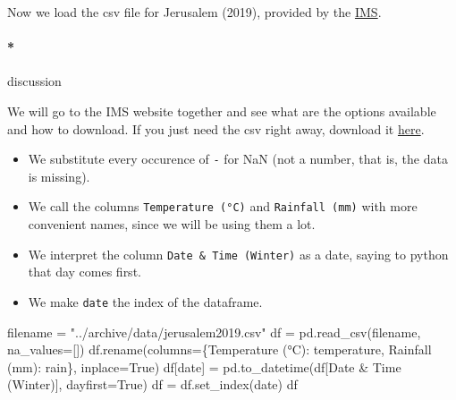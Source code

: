 \documentclass[
  letterpaper,
  DIV=11,
  numbers=noendperiod,
  oneside]{scrreprt}
\let\oldparagraph\paragraph
\renewcommand{\paragraph}[1]{\oldparagraph{#1}\mbox{}}
\newenvironment{Shaded}{\begin{snugshade}}{\end{snugshade}}
\newcommand{\NormalTok}[1]{\textcolor[rgb]{0.00,0.23,0.31}{#1}}
\newcommand{\OperatorTok}[1]{\textcolor[rgb]{0.37,0.37,0.37}{#1}}
\newcommand{\StringTok}[1]{\textcolor[rgb]{0.13,0.47,0.30}{#1}}
\newcommand{\VariableTok}[1]{\textcolor[rgb]{0.07,0.07,0.07}{#1}}
\providecommand{\tightlist}{%
  \setlength{\itemsep}{0pt}\setlength{\parskip}{0pt}}\usepackage{longtable,booktabs,array}
\begin{document}
Now we load the csv file for Jerusalem (2019), provided by the
\href{https://ims.gov.il/en/data_gov}{IMS}.

\hypertarget{discussion-2}{%
\paragraph*{discussion}\label{discussion-2}}

We will go to the IMS website together and see what are the options
available and how to download. If you just need the csv right away,
download it
\href{https://raw.githubusercontent.com/yairmau/time-series/main/archive/data/jerusalem2019.csv}{here}.

\begin{itemize}
\tightlist
\item
  We substitute every occurence of \texttt{-} for NaN (not a number,
  that is, the data is missing).
\item
  We call the columns \texttt{Temperature\ (°C)} and
  \texttt{Rainfall\ (mm)} with more convenient names, since we will be
  using them a lot.
\item
  We interpret the column \texttt{Date\ \&\ Time\ (Winter)} as a date,
  saying to python that day comes first.
\item
  We make \texttt{date} the index of the dataframe.
\end{itemize}

\begin{Shaded}
\begin{Highlighting}[]
\NormalTok{filename }\OperatorTok{=} \StringTok{"../archive/data/jerusalem2019.csv"}
\NormalTok{df }\OperatorTok{=}\NormalTok{ pd.read\_csv(filename, na\_values}\OperatorTok{=}\NormalTok{[}\StringTok{\textquotesingle{}{-}\textquotesingle{}}\NormalTok{])}
\NormalTok{df.rename(columns}\OperatorTok{=}\NormalTok{\{}\StringTok{\textquotesingle{}Temperature (°C)\textquotesingle{}}\NormalTok{: }\StringTok{\textquotesingle{}temperature\textquotesingle{}}\NormalTok{,}
                   \StringTok{\textquotesingle{}Rainfall (mm)\textquotesingle{}}\NormalTok{: }\StringTok{\textquotesingle{}rain\textquotesingle{}}\NormalTok{\}, inplace}\OperatorTok{=}\VariableTok{True}\NormalTok{)}
\NormalTok{df[}\StringTok{\textquotesingle{}date\textquotesingle{}}\NormalTok{] }\OperatorTok{=}\NormalTok{ pd.to\_datetime(df[}\StringTok{\textquotesingle{}Date \& Time (Winter)\textquotesingle{}}\NormalTok{], dayfirst}\OperatorTok{=}\VariableTok{True}\NormalTok{)}
\NormalTok{df }\OperatorTok{=}\NormalTok{ df.set\_index(}\StringTok{\textquotesingle{}date\textquotesingle{}}\NormalTok{)}
\NormalTok{df}
\end{Highlighting}
\end{Shaded}
\end{document}
